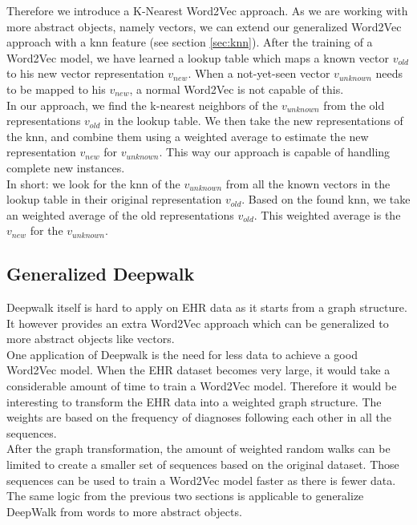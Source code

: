 Therefore we introduce a K-Nearest Word2Vec approach. As we are working with more abstract objects, namely vectors, we can extend our generalized Word2Vec approach with a knn feature (see section \ref{sec:knn}). After the training of a Word2Vec model, we have learned a lookup table which maps a known vector $v_{old}$ to his new vector representation $v_{new}$. When a not-yet-seen vector $v_{unknown}$ needs to be mapped to his $v_{new}$, a normal Word2Vec is not capable of this. \\
In our approach, we find the k-nearest neighbors of the $v_{unknown}$ from the old representations $v_{old}$ in the lookup table. We then take the new representations of the knn, and combine them using a weighted average to estimate the new representation $v_{new}$ for $v_{unknown}$. This way our approach is capable of handling complete new instances. \\

In short: we look for the knn of the $v_{unknown}$ from all the known vectors in the lookup table in their original representation $v_{old}$. Based on the found knn, we take an weighted average of the old representations $v_{old}$. This weighted average is the $v_{new}$ for the $v_{unknown}$.

\subsection{Generalized Deepwalk}

Deepwalk itself is hard to apply on EHR data as it starts from a graph structure. It however provides an extra Word2Vec approach which can be generalized to more abstract objects like vectors. \\

One application of Deepwalk is the need for less data to achieve a good Word2Vec model. When the EHR dataset becomes very large, it would take a considerable amount of time to train a Word2Vec model. Therefore it would be interesting to transform the EHR data into a weighted graph structure. The weights are based on the frequency of diagnoses following each other in all the sequences. \\
After the graph transformation, the amount of weighted random walks can be limited to create a smaller set of sequences based on the original dataset. Those sequences can be used to train a Word2Vec model faster as there is fewer data. The same logic from the previous two sections is applicable to generalize DeepWalk from words to more abstract objects.


